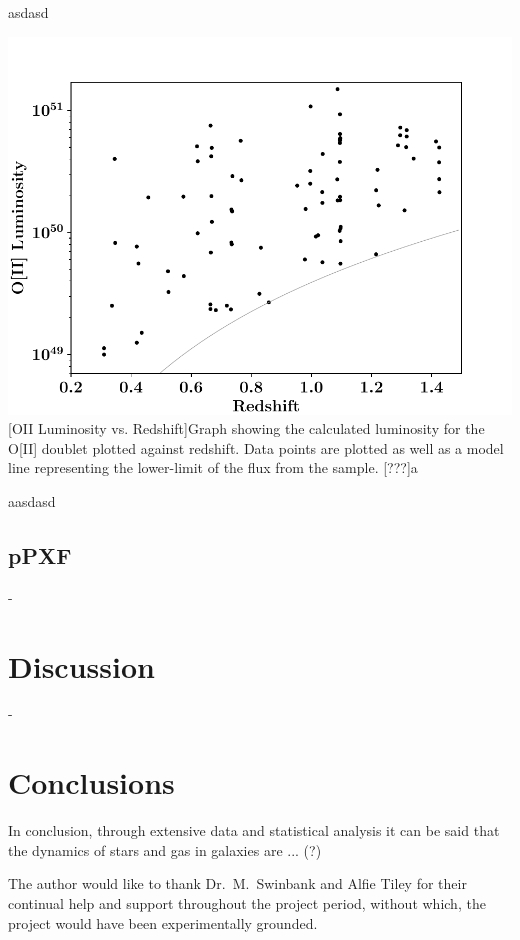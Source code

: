 \documentclass[12pt, twocolumn]{revtex4}    %
\begin{document}
\twocolumngrid

asdasd

\begin{center}
\includegraphics[width=1.0\linewidth]{data/o_ii_luminosity_vs_redshift}
[OII Luminosity vs. Redshift]{Graph showing the calculated luminosity for the O[II] doublet plotted against redshift. Data points are plotted as well as a model line representing the lower-limit of the flux from the sample. [???]a}
\label{fig:oiiluminosity_redshift}
\end{center}

aasdasd

\subsection{pPXF} 

-

\section{Discussion} 

-

\section{Conclusions}
 
In conclusion, through extensive data and statistical analysis it can be said that the dynamics of stars and gas in galaxies are ... (?) 

\begin{acknowledgments}
The author would like to thank Dr.~M.~Swinbank and Alfie Tiley for their continual help and support throughout the project period, without which, the project would have been experimentally grounded.
\end{acknowledgments}



\end{document}
